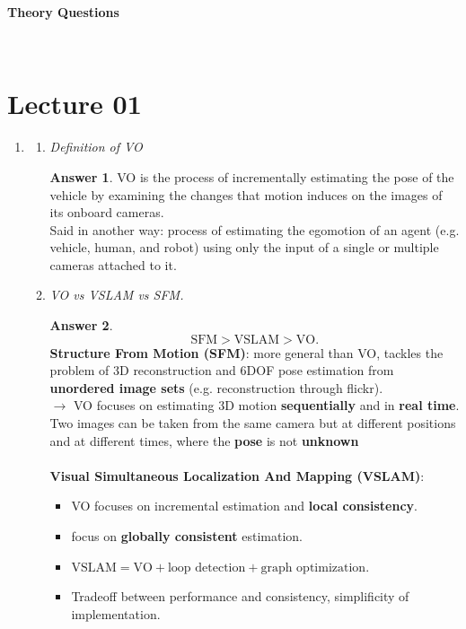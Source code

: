 \documentclass[a4paper,12 pt]{article}
\theoremstyle{definition}
\theoremstyle{remark}
\theoremstyle{definition}
\theoremstyle{definition}
\theoremstyle{definition}
\theoremstyle{definition}
\theoremstyle{remark}
\theoremstyle{remark}
\theoremstyle{definition}
\theoremstyle{definition}
\newtheorem*{answer}{Answer}
\begin{document}
\begin{huge}{\textbf{Theory Questions}}\end{huge} \\
\setcounter{section}{1}
\setcounter{secnumdepth}{4}
\setcounter{section}{0}
\setcounter{subsection}{0}
\section*{Lecture 01}
\begin{enumerate}
\item 
\begin{enumerate}
\item \textit{Definition of VO}
\begin{answer}
VO is the process of incrementally estimating the pose of the vehicle by examining the changes that motion induces on the images of its onboard cameras.\\
Said in another way: process of estimating the egomotion of an agent (e.g. vehicle, human, and robot) using only the input of a single or multiple cameras attached to it.
\end{answer}
\item \textit{VO vs VSLAM vs SFM.}
\begin{answer}
\begin{equation*}
\text{SFM}>\text{VSLAM}>\text{VO}.
\end{equation*}
\textbf{Structure From Motion (SFM)}: more general than VO, tackles the problem of 3D reconstruction and 6DOF pose estimation from \textbf{unordered image sets} (e.g. reconstruction through flickr). \\
$\rightarrow$ VO focuses on estimating 3D motion \textbf{sequentially} and in \textbf{real time}. \\ 
Two images can be taken from the same camera but at different positions and at different times, where the \textbf{pose} is not \textbf{unknown}\\ \\ 
\textbf{Visual Simultaneous Localization And Mapping (VSLAM)}:
\begin{itemize}
\item VO focuses on incremental estimation and \textbf{local consistency}.
\item focus on \textbf{globally consistent} estimation.
\item $\text{VSLAM}=\text{VO}+\text{loop detection} +\text{graph optimization}$.
\item Tradeoff between performance and consistency, simplificity of implementation.

\end{itemize}
\end{answer}
\end{enumerate}
\end{enumerate}
\end{document}
